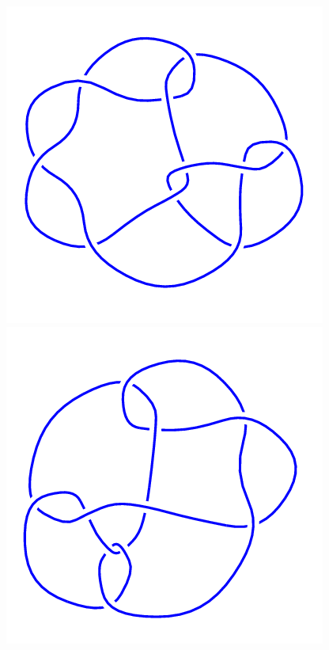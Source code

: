 \begin{figure}[H]
	\begin{minipage}[b]{.18\linewidth}
		\centering
		\includegraphics[width=\linewidth]{../data/10_132.png}
	\end{minipage}
	\begin{minipage}[b]{.18\linewidth}
		\centering
		\includegraphics[width=\linewidth]{../data/10_133.png}

\end{minipage}
\end{figure}
